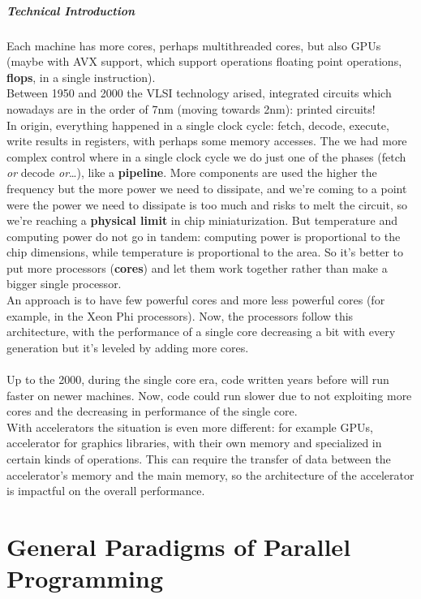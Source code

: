 \documentclass[10pt]{report}
\begin{document}
\paragraph{Technical Introduction} Each machine has more cores, perhaps multithreaded cores, but also GPUs (maybe with AVX support, which support operations floating point operations, \textbf{flops}, in a single instruction).\\
Between 1950 and 2000 the VLSI technology arised, integrated circuits which nowadays are in the order of 7nm (moving towards 2nm): printed circuits!\\
In origin, everything happened in a single clock cycle: fetch, decode, execute, write results in registers, with perhaps some memory accesses. The we had more complex control where in a single clock cycle we do just one of the phases (fetch \textit{or} decode \textit{or}\ldots), like a \textbf{pipeline}. More components are used the higher the frequency but the more power we need to dissipate, and we're coming to a point were the power we need to dissipate is too much and risks to melt the circuit, so we're reaching a \textbf{physical limit} in chip miniaturization. But temperature and computing power do not go in tandem: computing power is proportional to the chip dimensions, while temperature is proportional to the area. So it's better to put more processors (\textbf{cores}) and let them work together rather than make a bigger single processor.\\
An approach is to have few powerful cores and more less powerful cores (for example, in the Xeon Phi processors). Now, the processors follow this architecture, with the performance of a single core decreasing a bit with every generation but it's leveled by adding more cores.\\\\
Up to the 2000, during the single core era, code written years before will run faster on newer machines. Now, code could run slower due to not exploiting more cores and the decreasing in performance of the single core.\\With accelerators the situation is even more different: for example GPUs, accelerator for graphics libraries, with their own memory and specialized in certain kinds of operations. This can require the transfer of data between the accelerator's memory and the main memory, so the architecture of the accelerator is impactful on the overall performance.
\chapter{General Paradigms of Parallel Programming}
\end{document}
